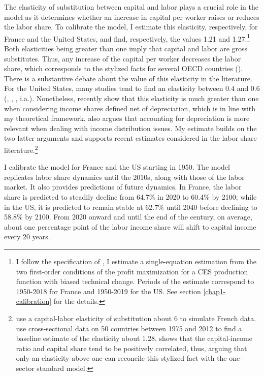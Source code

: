 The elasticity of substitution between capital and labor plays a crucial role in the model as it determines whether an increase in capital per worker raises or reduces the labor share. To calibrate the model, I estimate this elasticity, respectively, for France and the United States, and find, respectively, the values 1.21 and 1.27.\footnote{
I follow the specification of \citet{Klump2007Factor}, I estimate a single-equation estimation from the two first-order conditions of the profit maximization for a CES production function with biased technical change. Periods of the estimate correspond to 1950-2018 for France and 1950-2019 for the US. See section \ref{chap1-calibration} for the details.} 
Both elasticities being greater than one imply that capital and labor are gross substitutes. Thus, any increase of the capital per worker decreases the labor share, which corresponds to the stylized facts for several OECD countries (\citealt{Karabarbounis2014Global}). There is a substantive debate about the value of this elasticity in the literature. For the United States, many studies tend to find an elasticity between 0.4 and 0.6 (\citealt{Antras2004Aggregate}, \citealt{Chirinko2008Sigma}, \citealt{LeonLedesma2010Identifying}, i.a.). Nonetheless, \citet{Chirinko2017Substitution} recently show that this elasticity is much greater than one when considering income shares defined net of depreciation, which is in line with my theoretical framework. \citet{Rognlie2016Deciphering} also argues that accounting for depreciation is more relevant when dealing with income distribution issues. My estimate builds on the two latter arguments and supports recent estimates considered in the labor share literature.\footnote{
\citet{Caballero1998Jobless} use a capital-labor elasticity of substitution about 6 to simulate French data. \citet{Karabarbounis2014Global} use cross-sectional data on 50 countries between 1975 and 2012 to find a baseline estimate of the elasticity about 1.28. \citet{Piketty2015About} shows that the capital-income ratio and capital share tend to be positively correlated, thus, arguing that only an elasticity above one can reconcile this stylized fact with the one-sector standard model.}

I calibrate the model for France and the US starting in 1950. The model replicates labor share dynamics until the 2010s, along with those of the labor market. It also provides predictions of future dynamics. In France, the labor share is predicted to steadily decline from 64.7\% in 2020 to 60.4\% by 2100; while in the US, it is predicted to remain stable at 62.7\% until 2040 before declining to 58.8\% by 2100. From 2020 onward and until the end of the century, on average, about one percentage point of the labor income share will shift to capital income every 20 years.

